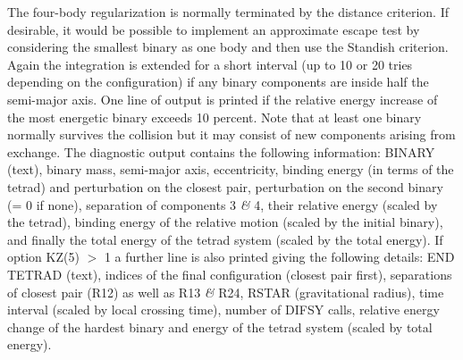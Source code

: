  The four-body regularization is normally terminated by the distance criterion.  If desirable, it                
   would be possible to implement an approximate escape test by considering the smallest binary as one                  
   body and then use the Standish criterion.  Again the integration is extended for a short interval (up                
   to 10 or 20 tries depending on the configuration) if any binary components are inside half the                       
   semi-major axis.  One line of output is printed if the relative energy increase of the most energetic                
   binary exceeds 10 percent.  Note that at least one binary normally survives the collision but it may                 
   consist of new components arising from exchange.  The diagnostic output contains the following                          
   information:  BINARY (text), binary mass, semi-major axis, eccentricity, binding energy (in terms of                 
   the tetrad) and perturbation on the closest pair, perturbation on the second binary (= 0 if none),                   
   separation of components 3 {\it\&} 4, their relative energy (scaled by the tetrad), binding energy of the                  
   relative motion (scaled by the initial binary), and finally the total energy of the tetrad system                     
   (scaled by the total energy).  If option KZ(5) $>$ 1 a further line is also printed giving the                         
   following details:  END TETRAD (text), indices of the final configuration (closest pair first),                      
   separations of closest pair (R12) as well as R13 {\it\&} R24, RSTAR (gravitational radius), time interval                  
   (scaled by local crossing time), number of DIFSY calls, relative energy change of the hardest binary                 
   and energy of the tetrad system (scaled by total energy).                                                            

